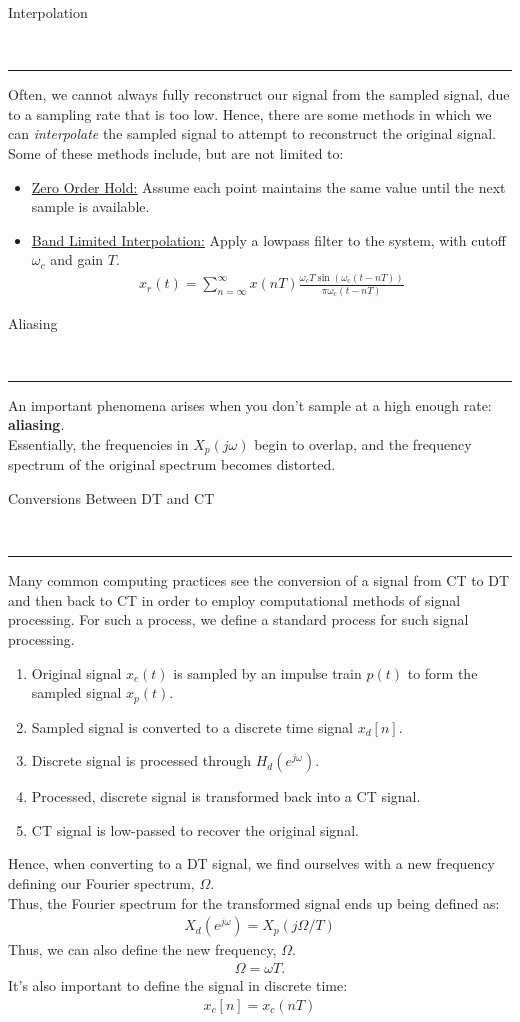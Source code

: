 \documentclass{article}
\newcommand{\sheader}[1]{\underline{#1:}}
\newcommand{\ejw}{{e^\jomega}}
\newcommand{\header}[1]{\begin{large}\noindent #1\end{large}\\\rule{\textwidth}{0.5pt}}
\newcommand{\gap}{\medskip\\}
\newcommand{\jomega}{{j\omega}}
\begin{document}
\header{Interpolation}
Often, we cannot always fully reconstruct our signal from the sampled signal, due
to a sampling rate that is too low. Hence, there are some methods in which 
we can \textit{interpolate} the sampled signal to attempt to reconstruct the 
original signal. Some of these methods include, but are not limited to:
\begin{itemize}
    \item \sheader{Zero Order Hold} Assume each point maintains the same value
    until the next sample is available.
    \item \sheader{Band Limited Interpolation} Apply a lowpass filter to the 
    system, with cutoff $\omega_c$ and gain $T$.
    \begin{align*}
        x_r(t) = \sum_{n = \infty}^\infty x(nT)\frac{\omega_c T \sin(\omega_c(t - nT))}{\pi \omega_c(t - nT)}
    \end{align*}
\end{itemize}

\header{Aliasing}

An important phenomena arises when you don't sample at a high enough rate: \textbf{aliasing}.
\gap
Essentially, the frequencies in $X_p(\jomega)$ begin to overlap, and the frequency
spectrum of the original spectrum becomes distorted.
\gap
\header{Conversions Between DT and CT}

Many common computing practices see the conversion of a signal from CT to DT and then
back to CT in order to employ computational methods of signal processing. For such
a process, we define a standard process for such signal processing.

\begin{enumerate}
    \item Original signal $x_c(t)$ is sampled by an impulse train $p(t)$ to form
    the sampled signal $x_p(t)$.
    \item Sampled signal is converted to a discrete time signal $x_d[n]$.
    \item Discrete signal is processed through $H_d(\ejw)$.
    \item Processed, discrete signal is transformed back into a CT signal.
    \item CT signal is low-passed to recover the original signal.
\end{enumerate}

Hence, when converting to a DT signal, we find ourselves with a new frequency 
defining our Fourier spectrum, $\Omega$.
\gap
Thus, the Fourier spectrum for the transformed signal ends up being defined as:
\begin{align*}
    X_d(\ejw) = X_p(j\Omega / T)
\end{align*}
Thus, we can also define the new frequency, $\Omega$.
\begin{align*}
    \Omega = \omega T.
\end{align*}
It's also important to define the signal in discrete time:
\begin{align*}
    x_c[n] = x_c(nT)
\end{align*}
\end{document}
